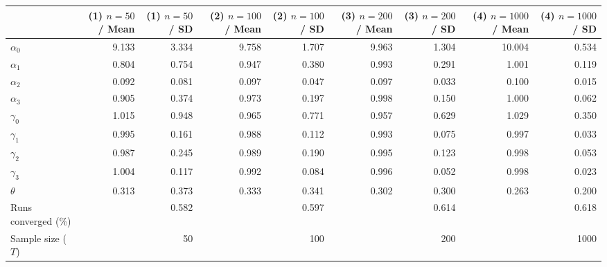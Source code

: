 
\begin{tabular}[t]{lrrrrrrrr}
\toprule
  & (1) $n=50$ / Mean & (1) $n=50$ / SD & (2) $n=100$ / Mean & (2) $n=100$ / SD & (3) $n=200$ / Mean & (3) $n=200$ / SD & (4) $n=1000$ / Mean & (4) $n=1000$ / SD\\
\midrule
$\alpha_{0}$ & 9.133 & 3.334 & 9.758 & 1.707 & 9.963 & 1.304 & 10.004 & 0.534\\
$\alpha_{1}$ & 0.804 & 0.754 & 0.947 & 0.380 & 0.993 & 0.291 & 1.001 & 0.119\\
$\alpha_{2}$ & 0.092 & 0.081 & 0.097 & 0.047 & 0.097 & 0.033 & 0.100 & 0.015\\
$\alpha_{3}$ & 0.905 & 0.374 & 0.973 & 0.197 & 0.998 & 0.150 & 1.000 & 0.062\\
$\gamma_{0}$ & 1.015 & 0.948 & 0.965 & 0.771 & 0.957 & 0.629 & 1.029 & 0.350\\
$\gamma_{1}$ & 0.995 & 0.161 & 0.988 & 0.112 & 0.993 & 0.075 & 0.997 & 0.033\\
$\gamma_{2}$ & 0.987 & 0.245 & 0.989 & 0.190 & 0.995 & 0.123 & 0.998 & 0.053\\
$\gamma_{3}$ & 1.004 & 0.117 & 0.992 & 0.084 & 0.996 & 0.052 & 0.998 & 0.023\\
$\theta$ & 0.313 & 0.373 & 0.333 & 0.341 & 0.302 & 0.300 & 0.263 & 0.200\\
Runs converged (\%) &  & 0.582 &  & 0.597 &  & 0.614 &  & 0.618\\
Sample size ($T$) &  & 50 &  & 100 &  & 200 &  & 1000\\
\bottomrule
\end{tabular}
